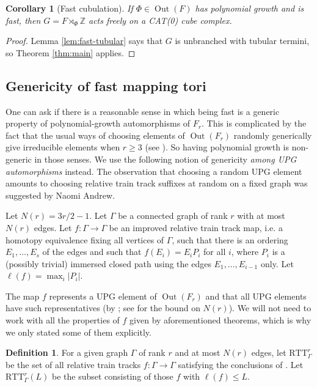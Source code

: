 \documentclass[11pt,oneside]{amsart}
\newcounter{ax}
\newtheorem{cor}[thm]{Corollary}
\theoremstyle{definition}
\newtheorem{defn}[thm]{Definition}
\DeclareMathOperator{\Out}{Out}
\newcommand{\field}[1]{\mathbb{#1}}
\newcommand{\integers}{\ensuremath{\field{Z}}}
\newcommand{\ttm}{\mathrm{RTT}}
\begin{document}
\begin{cor}[Fast cubulation]\label{cor:fast-cubulated}
If $\Phi\in\Out(F)$ has polynomial growth and is fast, then $G=F\rtimes_\Phi\integers$ acts freely on a CAT(0) cube complex.
\end{cor}

\begin{proof}
Lemma \ref{lem:fast-tubular} says that $G$ is unbranched with tubular termini, so Theorem \ref{thm:main} applies.
\end{proof}

\subsection{Genericity of fast mapping tori}\label{subsection:genericity}
One can ask if there is a reasonable sense in which being fast is a generic property of polynomial-growth automorphisms of $F_r$.  This is complicated by the fact that the usual ways of choosing elements of $\Out(F_r)$ randomly generically give irreducible elements when $r\geq 3$ (see \cite{KMPT}).  So having polynomial growth is non-generic in those senses.  We  use the following notion of genericity \emph{among UPG automorphisms} instead.  The observation that choosing a random UPG element amounts to choosing relative train track suffixes at random on a fixed graph was suggested by Naomi Andrew.

Let $N(r)=3r/2-1$.  Let $\Gamma$ be a connected graph of rank $r$ with at most $N(r)$ edges.  Let $f:\Gamma\to\Gamma$ be an improved relative train track map, i.e. a homotopy equivalence fixing all vertices of $\Gamma$, such that there is an ordering $E_1,\ldots,E_s$ of the edges and such that $f(E_i)=E_iP_i$ for all $i$, where $P_i$ is a (possibly trivial) immersed closed path using the edges $E_1,\ldots,E_{i-1}$ only.  Let $\ell(f)=\max_i|P_i|$. 

The map $f$ represents a UPG element of $\Out(F_r)$ and that all UPG elements have such representatives (by \cite[Thm. 5.1.8]{BFH:tits-I}; see \cite[Thm. 1.1]{BFH:kolchin} for the bound on $N(r)$).  We will not need to work with all the properties of $f$ given by aforementioned theorems, which is why we only stated some of them explicitly.

\begin{defn}\label{defn:RTT-sets}
For a given graph $\Gamma$ of rank $r$ and at most $N(r)$ edges, let $\ttm_\Gamma^r$ be the set of all relative train tracks $f:\Gamma\to\Gamma$ satisfying the conclusions of \cite[Thm. 5.1.8]{BFH:tits-I}.  Let $\ttm_\Gamma^r(L)$ be the subset consisting of those $f$ with $\ell(f)\leq L$.
\end{defn}
\end{document}
